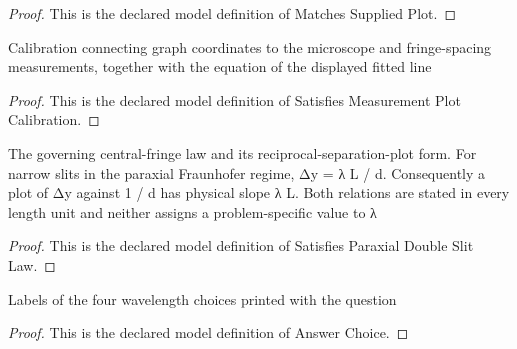 \begin{proof}
  This is the declared model definition of Matches Supplied Plot.
\end{proof}
\begin{definition}
  \label{def:physics:phyx-mini-0119:phyxminiproblems-problemphyxmini0119-satisfiesmeasurementplotcalibration}
  Calibration connecting graph coordinates to the microscope and fringe-spacing measurements, together with the equation of the displayed fitted line
\end{definition}
\begin{proof}
  This is the declared model definition of Satisfies Measurement Plot Calibration.
\end{proof}
\begin{definition}
  \label{def:physics:phyx-mini-0119:phyxminiproblems-problemphyxmini0119-satisfiesparaxialdoubleslitlaw}
  The governing central-fringe law and its reciprocal-separation-plot form. For narrow slits in the paraxial Fraunhofer regime, Δy = λ L / d. Consequently a plot of Δy against 1 / d has physical slope λ L. Both relations are stated in every length unit and neither assigns a problem-specific value to λ
\end{definition}
\begin{proof}
  This is the declared model definition of Satisfies Paraxial Double Slit Law.
\end{proof}
\begin{definition}
  \label{def:physics:phyx-mini-0119:phyxminiproblems-problemphyxmini0119-answerchoice}
  Labels of the four wavelength choices printed with the question
\end{definition}
\begin{proof}
  This is the declared model definition of Answer Choice.
\end{proof}
